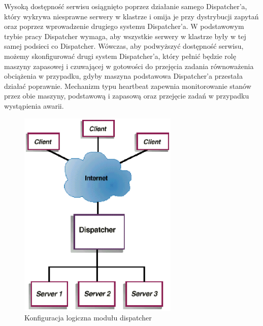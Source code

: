 Wysoką dostępność serwisu osiągnięto poprzez działanie samego Dispatcher'a, który wykrywa niesprawne serwery w klastrze i 
omija je przy dystrybucji zapytań oraz poprzez wprowadzenie drugiego systemu Dispatcher'a. W podstawowym trybie pracy 
Dispatcher wymaga, aby wszystkie serwery w klastrze były w tej samej podsieci co Dispatcher. Wówczas, aby podwyższyć 
dostępność serwisu, możemy skonfigurować drugi system Dispatcher'a, który pełnić będzie rolę maszyny zapasowej i czuwającej w 
gotowości do przejęcia zadania równoważenia obciążenia w przypadku, gdyby maszyna podstawowa Dispatcher'a przestała działać 
poprawnie. Mechanizm typu heartbeat zapewnia monitorowanie stanów przez obie maszyny, podstawową i zapasową oraz przejęcie 
zadań w przypadku wystąpienia awarii.
\begin{figure}[h]
\centering
\includegraphics[width=3in]{./rysunki/dispatcher.eps}
\caption{Konfiguracja logiczna modułu dispatcher}
\label{dispatcher}
\end{figure}

